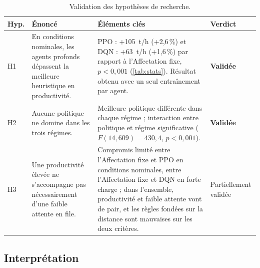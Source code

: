 \documentclass[11pt,a4paper]{article}
\newif\ifrevmarks
\newcommand{\revtag}[1]{\ifrevmarks\textsuperscript{\textcolor{red!70!black}{\scriptsize[#1]}}\fi}
\newcommand{\rev}[2]{\ifrevmarks{\color{revcolor}#2}\revtag{#1}\else#2\fi}
\begin{document}
\begin{table}[H]
\caption{\rev{M23, M3}{Validation des hypothèses de recherche.}}
\label{tab:hypotheses}
\footnotesize\setlength{\tabcolsep}{4pt}
\begin{tabularx}{\textwidth}{@{}lXXl@{}}
\toprule
\textbf{Hyp.} & \textbf{Énoncé} & \textbf{Éléments clés} & \textbf{Verdict} \\
\midrule
H1 & En conditions nominales, les agents profonds dépassent la meilleure heuristique en productivité. & PPO : +105~t/h (+2,6\,\%) et DQN : +63~t/h (+1,6\,\%) par rapport à l'Affectation fixe, $p<0{,}001$ (\cref{tab:stats}). Résultat obtenu avec un seul entraînement par agent. & \textbf{Validée} \\[4pt]
H2 & Aucune politique ne domine dans les trois régimes. & Meilleure politique différente dans chaque régime ; interaction entre politique et régime significative ($F(14,609)=430{,}4$, $p<0{,}001$). & \textbf{Validée} \\[4pt]
H3 & Une productivité élevée ne s'accompagne pas nécessairement d'une faible attente en file. & Compromis limité entre l'Affectation fixe et PPO en conditions nominales, entre l'Affectation fixe et DQN en forte charge ; dans l'ensemble, productivité et faible attente vont de pair, et les règles fondées sur la distance sont mauvaises sur les deux critères. & Partiellement validée \\
\bottomrule
\end{tabularx}
\end{table}

\subsection{Interprétation}
\end{document}
